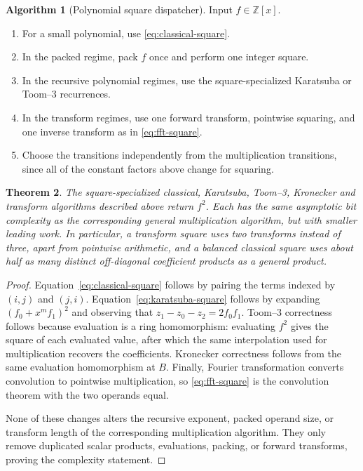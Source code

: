 \documentclass[11pt]{book}
\newtheorem{theorem}{Theorem}[section]
\theoremstyle{definition}
\newtheorem{algorithm}[theorem]{Algorithm}
\newcommand{\ZZ}{\mathbb Z}
\begin{document}
\begin{algorithm}[Polynomial square dispatcher]\label{alg:poly-square-dispatch}
Input $f\in\ZZ[x]$.
\begin{enumerate}
 \item For a small polynomial, use \eqref{eq:classical-square}.
 \item In the packed regime, pack $f$ once and perform one integer square.
 \item In the recursive polynomial regimes, use the square-specialized
 Karatsuba or Toom--3 recurrences.
 \item In the transform regimes, use one forward transform, pointwise
 squaring, and one inverse transform as in \eqref{eq:fft-square}.
 \item Choose the transitions independently from the multiplication
 transitions, since all of the constant factors above change for squaring.
\end{enumerate}
\end{algorithm}

\begin{theorem}\label{thm:poly-square-correctness-complexity}
The square-specialized classical, Karatsuba, Toom--3, Kronecker and transform
algorithms described above return $f^2$.  Each has the same asymptotic bit
complexity as the corresponding general multiplication algorithm, but with
smaller leading work.  In particular, a transform square uses two transforms
instead of three, apart from pointwise arithmetic, and a balanced classical
square uses about half as many distinct off-diagonal coefficient products as
a general product.
\end{theorem}

\begin{proof}
Equation~\eqref{eq:classical-square} follows by pairing the terms indexed by
$(i,j)$ and $(j,i)$.  Equation~\eqref{eq:karatsuba-square} follows by expanding
$(f_0+x^m f_1)^2$ and observing that
$z_1-z_0-z_2=2f_0f_1$.  Toom--3 correctness follows because evaluation is a
ring homomorphism: evaluating $f^2$ gives the square of each evaluated value,
after which the same interpolation used for multiplication recovers the
coefficients.  Kronecker correctness follows from the same evaluation
homomorphism at $B$.  Finally, Fourier transformation converts convolution to
pointwise multiplication, so \eqref{eq:fft-square} is the convolution theorem
with the two operands equal.

None of these changes alters the recursive exponent, packed operand size, or
transform length of the corresponding multiplication algorithm.  They only
remove duplicated scalar products, evaluations, packing, or forward
transforms, proving the complexity statement.
\end{proof}
\end{document}
